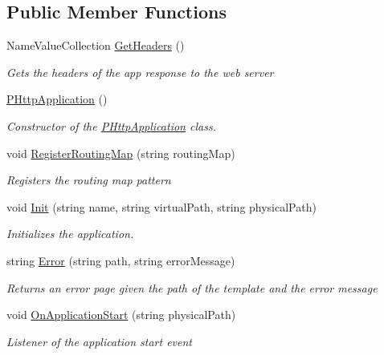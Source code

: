 \subsection*{Public Member Functions}
\begin{DoxyCompactItemize}
\item 
Name\+Value\+Collection \hyperlink{class_mvc_1_1_p_http_application_ae520dc0bf0c265e6c7114d918f9aa6a0}{Get\+Headers} ()
\begin{DoxyCompactList}\small\item\em Gets the headers of the app response to the web server \end{DoxyCompactList}\item 
\hyperlink{class_mvc_1_1_p_http_application_afea25215430e7e6346ba122a10693ed1}{P\+Http\+Application} ()
\begin{DoxyCompactList}\small\item\em Constructor of the \hyperlink{class_mvc_1_1_p_http_application}{P\+Http\+Application} class. \end{DoxyCompactList}\item 
void \hyperlink{class_mvc_1_1_p_http_application_a3a4aae05eadf7da66bdd37f96c48f79f}{Register\+Routing\+Map} (string routing\+Map)
\begin{DoxyCompactList}\small\item\em Registers the routing map pattern \end{DoxyCompactList}\item 
void \hyperlink{class_mvc_1_1_p_http_application_a79ba7ef50171a93e565f46d5e19ae019}{Init} (string name, string virtual\+Path, string physical\+Path)
\begin{DoxyCompactList}\small\item\em Initializes the application. \end{DoxyCompactList}\item 
string \hyperlink{class_mvc_1_1_p_http_application_acb04996af75e14fdfdc1dcacf7a52247}{Error} (string path, string error\+Message)
\begin{DoxyCompactList}\small\item\em Returns an error page given the path of the template and the error message \end{DoxyCompactList}\item 
void \hyperlink{class_mvc_1_1_p_http_application_a38a4aec623c570fbd05c9e4c33951a05}{On\+Application\+Start} (string physical\+Path)
\begin{DoxyCompactList}\small\item\em Listener of the application start event \end{DoxyCompactList}\item 

\end{DoxyCompactItemize}

